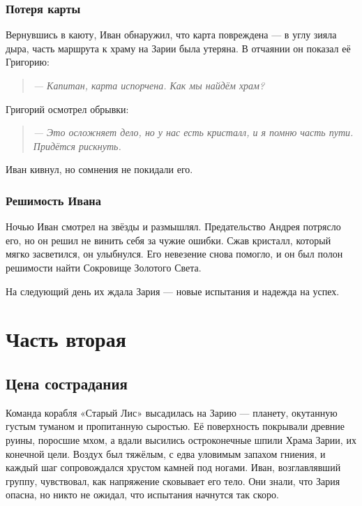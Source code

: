 \documentclass[12pt,a4paper]{book} %
\newenvironment{dialogue}{\begin{quote}\itshape}{\end{quote}}
\begin{document}
\section*{Потеря карты}

Вернувшись в каюту, Иван обнаружил, что карта повреждена --- в углу зияла дыра, часть маршрута к храму на Зарии была утеряна. В отчаянии он показал её Григорию:

\begin{dialogue}
--- Капитан, карта испорчена. Как мы найдём храм?
\end{dialogue}

Григорий осмотрел обрывки:

\begin{dialogue}
--- Это осложняет дело, но у нас есть кристалл, и я помню часть пути. Придётся рискнуть.
\end{dialogue}

Иван кивнул, но сомнения не покидали его.

\section*{Решимость Ивана}

Ночью Иван смотрел на звёзды и размышлял. Предательство Андрея потрясло его, но он решил не винить себя за чужие ошибки. Сжав кристалл, который мягко засветился, он улыбнулся. Его невезение снова помогло, и он был полон решимости найти Сокровище Золотого Света.

На следующий день их ждала Зария --- новые испытания и надежда на успех.

\part{Часть вторая}

\chapter{Цена сострадания}

Команда корабля «Старый Лис» высадилась на Зарию --- планету, окутанную густым туманом и пропитанную сыростью. Её поверхность покрывали древние руины, поросшие мхом, а вдали высились остроконечные шпили Храма Зарии, их конечной цели. Воздух был тяжёлым, с едва уловимым запахом гниения, и каждый шаг сопровождался хрустом камней под ногами. Иван, возглавлявший группу, чувствовал, как напряжение сковывает его тело. Они знали, что Зария опасна, но никто не ожидал, что испытания начнутся так скоро.
\end{document}
